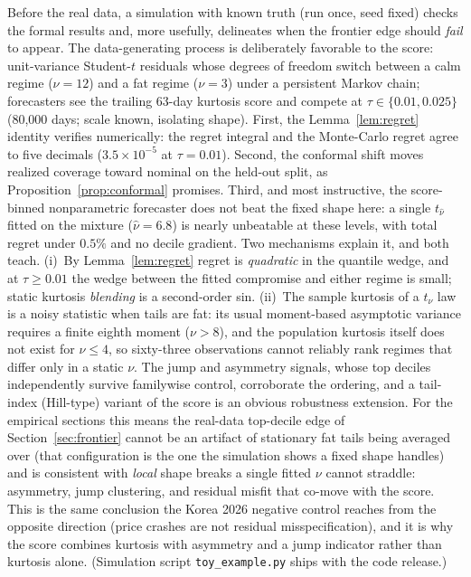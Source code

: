 \documentclass[11pt]{article}
\theoremstyle{remark}
\begin{document}
Before the real data, a simulation with known truth (run once, seed
fixed) checks the formal results and, more usefully, delineates when
the frontier edge should \emph{fail} to appear. The data-generating
process is deliberately favorable to the score: unit-variance
Student-$t$ residuals whose degrees of freedom switch between a calm
regime ($\nu=12$) and a fat regime ($\nu=3$) under a persistent Markov
chain; forecasters see the trailing 63-day kurtosis score and compete
at $\tau \in \{0.01, 0.025\}$ (80{,}000 days; scale known, isolating
shape). First, the Lemma~\ref{lem:regret} identity
verifies numerically: the regret integral and the Monte-Carlo regret
agree to five decimals ($3.5\times10^{-5}$ at $\tau=0.01$). Second, the
conformal shift moves realized coverage toward nominal on the held-out
split, as Proposition~\ref{prop:conformal} promises. Third, and most instructive, the score-binned nonparametric
forecaster does
not beat the fixed shape here: a single $t_{\widehat\nu}$
fitted on the mixture ($\widehat\nu = 6.8$) is nearly unbeatable at
these levels, with total regret under $0.5\%$ and no decile gradient.
Two mechanisms explain it, and both teach. (i)~By
Lemma~\ref{lem:regret} regret is \emph{quadratic} in the quantile
wedge, and at $\tau \ge 0.01$ the wedge between the fitted compromise
and either regime is small; static kurtosis \emph{blending} is a
second-order sin. (ii)~The sample kurtosis of a $t_\nu$ law is a noisy statistic when
tails are fat: its usual moment-based asymptotic variance requires a
finite eighth moment ($\nu>8$), and the population kurtosis itself does
not exist for $\nu\le4$, so sixty-three observations cannot reliably
rank regimes that differ only in a static $\nu$. The jump and
asymmetry signals, whose top deciles independently survive familywise
control, corroborate the ordering, and a tail-index (Hill-type)
variant of the score is an obvious robustness extension. For the empirical sections this means the real-data top-decile edge of Section~\ref{sec:frontier}
cannot be an artifact of stationary fat tails being averaged over
(that configuration is the one the simulation shows a fixed shape
handles) and is consistent with \emph{local} shape breaks a single
fitted $\nu$ cannot straddle: asymmetry, jump clustering, and residual misfit
that co-move with the score. This is the same conclusion the Korea 2026
negative control reaches from the opposite direction (price crashes
are not residual misspecification), and it is why the score combines
kurtosis with asymmetry and a jump indicator rather than kurtosis
alone. (Simulation script \texttt{toy\_example.py} ships with the code
release.)
\end{document}
